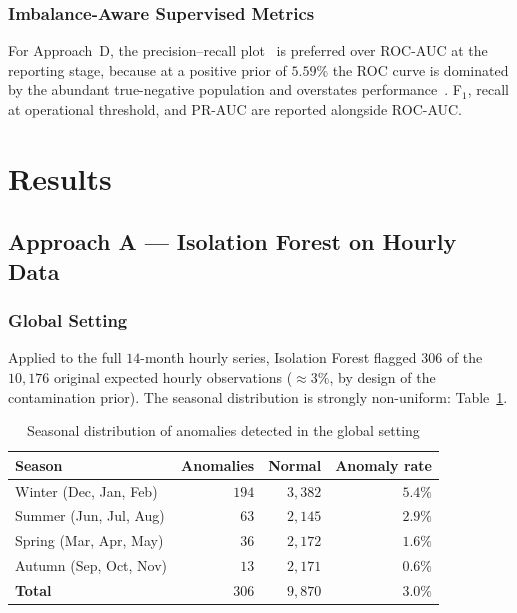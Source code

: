 \documentclass[11pt]{article}
\begin{document}
\begin{enumerate}[leftmargin=1.5em,itemsep=1pt]
\subsubsection*{Imbalance-Aware Supervised Metrics}
For Approach~D, the precision--recall plot~\cite{saito2015precision} is preferred over ROC-AUC at the reporting stage, because at a positive prior of $5.59\%$ the ROC curve is dominated by the abundant true-negative population and overstates performance~\cite{fawcett2006roc,hand2009measuring}. F$_1$, recall at operational threshold, and PR-AUC are reported alongside ROC-AUC.

\section{Results}\label{sec:results}

\subsection{Approach A --- Isolation Forest on Hourly Data}

\subsubsection*{Global Setting}
Applied to the full $14$-month hourly series, Isolation Forest flagged $306$ of the $10{,}176$ original expected hourly observations ($\approx 3\%$, by design of the contamination prior). The seasonal distribution is strongly non-uniform: Table~\ref{tab:seasonal}.

\begin{table}[H]
\centering
\caption{Seasonal distribution of anomalies detected in the global setting}
\label{tab:seasonal}
\begin{tabular}{lrrr}
\toprule
\textbf{Season} & \textbf{Anomalies} & \textbf{Normal} & \textbf{Anomaly rate}\\
\midrule
Winter   (Dec, Jan, Feb) & $194$ & $3{,}382$ & $5.4\%$\\
Summer   (Jun, Jul, Aug) &  $63$ & $2{,}145$ & $2.9\%$\\
Spring   (Mar, Apr, May) &  $36$ & $2{,}172$ & $1.6\%$\\
Autumn   (Sep, Oct, Nov) &  $13$ & $2{,}171$ & $0.6\%$\\
\midrule
\textbf{Total} & \textbf{$306$} & \textbf{$9{,}870$} & \textbf{$3.0\%$}\\
\bottomrule
\end{tabular}
\end{table}


\end{enumerate}
\end{document}

